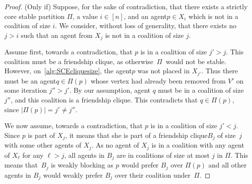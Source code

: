 \documentclass[a4paper,fleqn]{cas-sc}
\newcommand{\agent}{agent\xspace}
\newcommand{\agents}{agents\xspace}
\newcommand{\agentSetInMaxCoalition}{\ensuremath{X}\xspace}
\newcommand{\partition}{\ensuremath{\Pi}\xspace}
\newcommand{\blockingCoalition}{\ensuremath{B}\xspace}
\newcommand{\coalitionOfi}[1]{\ensuremath{\partition(#1)}\xspace}
\newcommand{\fcliq}{friendship clique\xspace}
\begin{document}
\begin{proof}
    (Only if) Suppose, for the sake of contradiction, that there exists a strictly core stable partition $\partition$, a value $i \in [n]$, and an \agent $p \in \agentSetInMaxCoalition_i$ which is not in a coalition of size $i$. We consider, without loss of generality, that there exists no $j > i$ such that an \agent from $\agentSetInMaxCoalition_j$ is not in a coalition of size $j$.


    Assume first, towards a contradiction, that $p$ is in a coalition of size $j' > j$. This coalition must be a \fcliq, as otherwise~\partition\ would not be stable.
    However, on~\cref{alg:SCEcliquesize}, the \agent $p$ was not placed in $\agentSetInMaxCoalition_{j'}$. Thus there must be an \agent $q \in \coalitionOfi{p}$ whose vertex had already been removed from $V'$ on some iteration $j'' > j'$.
    By our assumption, agent $q$ must be in a coalition of size $j''$, and this coalition is a \fcliq. This contradicts that $q \in \coalitionOfi{p}$, since $|\coalitionOfi{p}| = j' \neq j''$.
    
        
    We now assume, towards a contradiction, that $p$ is in a coalition of size $j'<j$. Since $p$ is part of $\agentSetInMaxCoalition_j$, it means that she is part of a \fcliq $\blockingCoalition_j$ of size~$j$ with some other \agents of $\agentSetInMaxCoalition_j$.
    As no \agent of $\agentSetInMaxCoalition_j$ is in a coalition with any agent of $\agentSetInMaxCoalition_\ell$ for any $\ell>j$, all agents in $\blockingCoalition_j$ are in coalitions of size at most $j$ in $\partition$.
    This means that~$\blockingCoalition_j$ is weakly blocking as $p$ would prefer $\blockingCoalition_j$ over \coalitionOfi{p} and all other \agents in $\blockingCoalition_j$ would weakly prefer $\blockingCoalition_j$ over their coalition under~\partition.


\end{proof}
\end{document}
